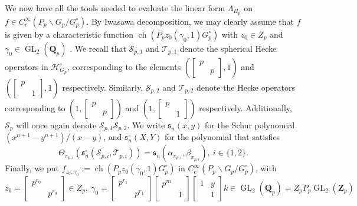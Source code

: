 \documentclass{amsart}%
\theoremstyle{plain}
\theoremstyle{plain}
\theoremstyle{remark}
\DeclareMathOperator{\GL}{GL}
\DeclareMathOperator{\ch}{ch}
\begin{document}
\noindent We now have all the tools needed to evaluate the linear form $\Lambda_{\Pi_p}$ on $f\in C_c^\infty(P_p\backslash G_p/G_p^\circ)$. By Iwasawa decomposition, we may clearly assume that $f$ is given by a characteristic function $\ch\left(P_pz_0(\gamma_0,1)G_p^\circ\right)$ with $z_0\in Z_p$ and $\gamma_0\in\GL_2(\mathbf{Q}_p)$ . 
\noindent We recall that $\mathcal{S}_{p,1}$ and $\mathcal{T}_{p,1}$ denote the spherical Hecke operators in $\mathcal{H}_{G_p}^\circ$, corresponding to the elements $\left(\left[\begin{smallmatrix}
    p & \\
     & p
\end{smallmatrix}\right],1\right)$ and $\left(\left[\begin{smallmatrix}
    p & \\
     & 1
\end{smallmatrix}\right],1\right)$ respectively. Similarly, $\mathcal{S}_{p,2}$ and $\mathcal{T}_{p,2}$ denote the Hecke operators corresponding to $\left(1,\left[\begin{smallmatrix}
    p & \\
     & p
\end{smallmatrix}\right]\right)$ and $\left(1,\left[\begin{smallmatrix}
    p & \\
     & 1
\end{smallmatrix}\right]\right)$ respectively. Additionally, $\mathcal{S}_p$ will once again denote $\mathcal{S}_{p,1}\mathcal{S}_{p,2}$. We write $\mathfrak{s}_n(x,y)$ for the Schur polynomial $(x^{n+1}-y^{n+1})/(x-y)$, and $\mathfrak{s}_n^\circ(X,Y)$ for the polynomial that satisfies $$\Theta_{\pi_{p,i}}\left(\mathfrak{s}_n^\circ(\mathcal{S}_{p,i},\mathcal{T}_{p,i})\right)=\mathfrak{s}_n\left(\alpha_{\pi_{p,i}},\beta_{\pi_{p,i}}\right),\ i\in\{1,2\}.$$Finally, we put $f_{z_0,\gamma_0}:=\ch\left(P_pz_0(\gamma_0,1)G_p^\circ\right)$ in $C_c^\infty(P_p\backslash G_p/G_p^\circ)$, with 
$$z_0=\left[\begin{smallmatrix}
    p^{r_0} & \\
     & p^{r_0}
\end{smallmatrix}\right]\in Z_p,\ \gamma_0=\left[\begin{smallmatrix}
    p^{r_1} & \\
     & p^{r_1}
\end{smallmatrix}\right]\left[\begin{smallmatrix}
    p^m &  \\
     & 1
\end{smallmatrix}\right]\left[\begin{smallmatrix}
    1 & y\\
    & 1
\end{smallmatrix}\right] k\in \GL_2(\mathbf{Q}_p)=Z_pP_p\GL_2(\mathbf{Z}_p)$$
\end{document}
